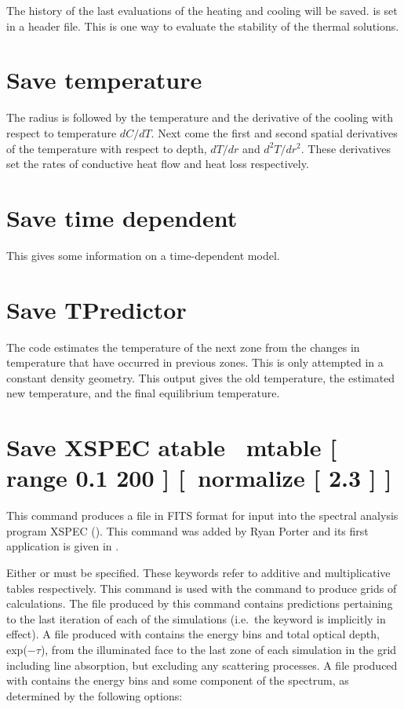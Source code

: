 The history of the last  evaluations of the
heating and cooling will be saved.
 is set in a header file.
This is one way to evaluate
the stability of the thermal solutions.

\section{Save temperature}

The radius is followed by the temperature and the derivative of the
cooling with respect to temperature $dC/dT$.
Next come the first and second spatial derivatives of the temperature
with respect to depth, $dT/dr$ and $d^2T/dr^2$.
These derivatives set the rates
of conductive heat flow and heat loss respectively.

\section{Save time dependent}
\label{sec:SaveTimeDependent}

This gives some information on a time-dependent model.

\section{Save TPredictor}

The code estimates the temperature of the next zone from the changes
in temperature that have occurred in previous zones.
This is only attempted
in a constant density geometry.
This output gives the old temperature,
the estimated new temperature, and the final equilibrium temperature.

\section{Save XSPEC atable \textbar\ mtable [ range 0.1 200 ] [~normalize [ 2.3 ] ]}

This command produces a file in FITS format for input into the spectral
analysis program XSPEC (\citealp{Arnaud1996}).
This command was added by Ryan Porter
and its first application is given in \citet{Porter2006}.

Either  or  must be specified. These
keywords refer to additive and multiplicative tables respectively. This
command is used with the  command to produce grids of
calculations. The file produced by this command contains predictions
pertaining to the last iteration of each of the simulations (i.e.\ the keyword
 is implicitly in effect). A file produced with
 contains the energy bins and total optical depth,
exp($-\tau$), from the illuminated face to the last zone of each simulation in
the grid including line absorption, but excluding any scattering processes.
A file produced with  contains the energy bins and
some component of the spectrum, as determined by the following options:

